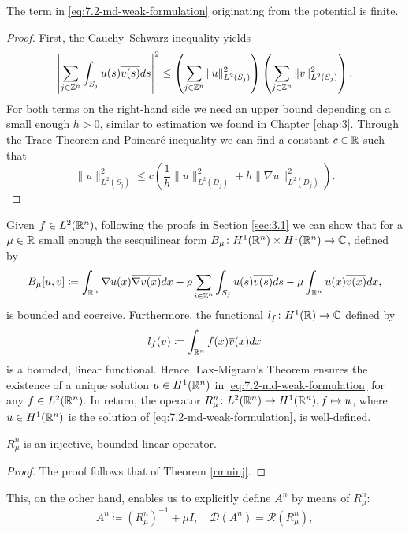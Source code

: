\begin{remark} 
	The term in \eqref{eq:7.2-md-weak-formulation} originating from the potential is finite.
	
	\begin{proof}
	 First, the Cauchy–Schwarz inequality yields
	\[ \left| \sum_{j \in \mathbb{Z}^{n}} \int_{S_{j}} u(s) \overline{v(s)} ds \right|^{2} \leq \left( \sum_{j \in \mathbb{Z}^{n}} \| u \|_{L^{2}(S_{j})}^{2} \right) \left( \sum_{j \in \mathbb{Z}^{n}} \| v \|_{L^{2}(S_{j})}^{2} \right). \] 
	For both terms on the right-hand side we need an upper bound depending on a small enough $h > 0$, similar to estimation we found in Chapter \ref{chap:3}. Through the Trace Theorem \cite[p. 258]{evans1998partial} and Poincaré inequality we can find a constant $c \in \mathbb{R}$ such that 
	\[ \| u \|_{L^{2}(S_{j})}^{2} \leq c \left( \frac{1}{h} \|u\|_{L^{2}(D_{j})}^{2} + h \| \nabla u \|_{L^{2}(D_{j})}^{2} \right). \]	\vspace{-0.5cm}
	\end{proof}
\end{remark}

Given $f \in L^{2}(\mathbb{R}^{n})$, following the proofs in Section \ref{sec:3.1} we can show that for a $\mu \in \mathbb{R}$ small enough the sesquilinear form $B_{\mu} \colon H^{1}(\mathbb{R}^{n}) \times H^{1}(\mathbb{R}^{n}) \rightarrow \mathbb{C}$, defined by
\[ B_{\mu}[u, v] \coloneqq \int_{\mathbb{R}^{n}} \nabla u(x) \overline{\nabla v(x)} dx + \rho \sum_{i \in \mathbb{Z}^{n}} \int_{S_{j}} u(s) \overline{v(s)} ds - \mu \int_{\mathbb{R}^{n}} u(x) \overline{v(x)} dx, \]
 is  bounded and coercive. Furthermore, the functional $l_{f} \colon H^{1}(\mathbb{R}) \rightarrow \mathbb{C}$ defined by
	\[ l_{f}(v) \coloneqq \int_{\mathbb{R}^{n}} f(x) \overline{v}(x) dx \]
is a bounded, linear functional. Hence, Lax-Migram's Theorem ensures the existence of a unique solution $u \in H^{1}(\mathbb{R}^{n})$ in \eqref{eq:7.2-md-weak-formulation} for any $f \in L^{2}(\mathbb{R}^{n})$. In return, the operator $R_{\mu}^{n} \colon L^{2}(\mathbb{R}^{n}) \rightarrow H^{1}(\mathbb{R}^{n}), f \mapsto u$, where $u \in H^{1}(\mathbb{R}^{n})$ is the solution of \eqref{eq:7.2-md-weak-formulation}, is well-defined. 

\begin{theorem} 
	$R_{\mu}^{n}$ is an injective, bounded linear operator. 
	
	\begin{proof}
		The proof follows that of Theorem \ref{rmuinj}.
	\end{proof}
\end{theorem}

This, on the other hand, enables us to explicitly define $A^{n}$ by means of $R_{\mu}^{n}$:
\[ A^{n} \coloneqq \left(R_{\mu}^{n}\right)^{-1} + \mu I, \quad \mathcal{D}(A^{n}) = \mathcal{R}(R_{\mu}^{n}), \]

